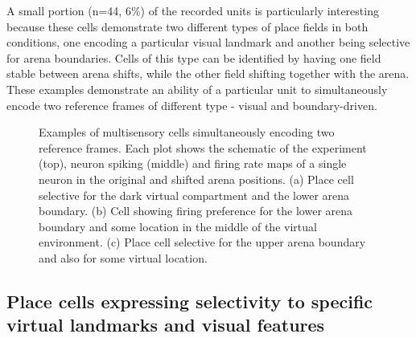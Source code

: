 A small portion (n=44, 6\%) of the recorded units is particularly interesting because these cells demonstrate two different types of place fields in both conditions, one encoding a particular visual landmark and another being selective for arena boundaries. Cells of this type can be identified by having one field stable between arena shifts, while the other field shifting together with the arena. These examples demonstrate an ability of a particular unit to simultaneously encode two reference frames of different type - visual and boundary-driven.

\begin{figure}
\captionsetup{format=plain}
\caption[Multimodal place cells]{
Examples of multisensory cells simultaneously encoding two reference frames. Each plot shows the schematic of the experiment (top), neuron spiking (middle) and firing rate maps of a single neuron in the original and shifted arena positions. (a) Place cell selective for the dark virtual compartment and the lower arena boundary. (b) Cell showing firing preference for the lower arena boundary and some location in the middle of the virtual environment. (c) Place cell selective for the upper arena boundary and also for some virtual location.
}
\label{fig:F14_multi_modal_cells}
\end{figure}


\subsection{Place cells expressing selectivity to specific virtual landmarks and visual features}

